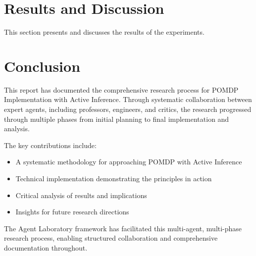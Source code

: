 \documentclass[11pt,a4paper]{article}
\begin{document}
\section{Results and Discussion}
This section presents and discusses the results of the experiments.

\section{Conclusion}
This report has documented the comprehensive research process for POMDP Implementation with Active Inference. Through systematic collaboration between expert agents, including professors, engineers, and critics, the research progressed through multiple phases from initial planning to final implementation and analysis.

The key contributions include:
\begin{itemize}
    \item A systematic methodology for approaching POMDP with Active Inference
    \item Technical implementation demonstrating the principles in action
    \item Critical analysis of results and implications
    \item Insights for future research directions
\end{itemize}

The Agent Laboratory framework has facilitated this multi-agent, multi-phase research process, enabling structured collaboration and comprehensive documentation throughout.
\end{document}
